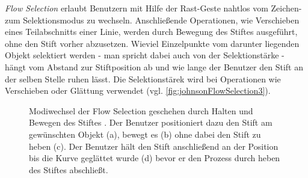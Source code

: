 \medskip \emph{Flow Selection} \citep{Johnson:2006} erlaubt Benutzern mit Hilfe der Rast-Geste nahtlos vom Zeichen- zum Selektionsmodus zu wechseln. Anschließende Operationen, wie Verschieben eines Teilabschnitts einer Linie, werden durch Bewegung des Stiftes ausgeführt, ohne den Stift vorher abzusetzen. Wieviel Einzelpunkte vom darunter liegenden Objekt selektiert werden - man spricht dabei auch von der Selektionstärke - hängt vom Abstand zur Stiftposition ab und wie lange der Benutzer den Stift an der selben Stelle ruhen lässt. Die Selektionstärek wird bei Operationen wie Verschieben oder Glättung verwendet (vgl. \autoref{fig:johnsonFlowSelection3}).

\begin{figure}
        \myfloatalign
         \quad
         \quad
		 \quad
         \quad
        \caption[Modiwechsel \newline \citep{Johnson:2009}]{Modiwechsel der Flow Selection geschehen durch Halten und Bewegen des Stiftes \citep{Johnson:2006}. Der Benutzer positioniert dazu den Stift am gewünschten Objekt (a), bewegt es (b) ohne dabei den Stift zu heben (c). Der Benutzer hält den Stift anschließend an der Position bis die Kurve geglättet wurde (d) bevor er den Prozess durch heben des Stiftes abschließt.}\label{fig:johnsonFlowSelection3}
\end{figure}
\clearpage
